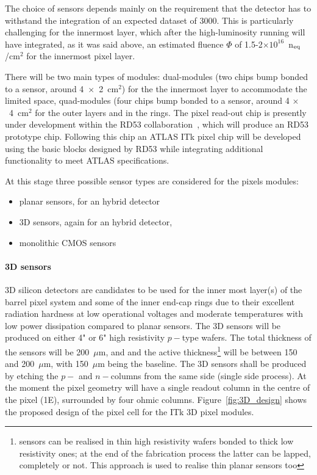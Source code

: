 The choice of sensors depends mainly on the requirement that the detector has to withstand the integration of an expected dataset  of 3000\invfb.  This is particularly challenging for the innermost layer, which after the high-luminosity running will have integrated, as it was said above,  an estimated fluence $\Phi$ of 1.5-2$\times10^{16}$~n$_{\rm eq}$/cm$^2$ for the innermost pixel layer. 

There will be two main types of modules: dual-modules (two chips bump bonded to a sensor, around 
4~$\times$~2~cm$^2$) for the the innermost layer to accommodate the limited space, quad-modules (four 
chips bump bonded to a sensor, around 4 $\times$~4~cm$^2$ for the outer layers and in the rings. 
The pixel read-out chip is presently under development within the RD53 collaboration~\cite{RD53}, 
which will produce an RD53 prototype chip. Following this chip an ATLAS ITk pixel chip will be developed 
using the basic blocks designed by RD53 while integrating additional functionality to meet ATLAS 
specifications.

At this stage three possible sensor types are considered for the pixels modules:

\begin{itemize}
\item planar sensors, for an hybrid detector
\item 3D sensors, again for an hybrid detector,
\item monolithic CMOS sensors
\end{itemize}

\paragraph{3D sensors}
3D silicon detectors are candidates to be used for the inner most layer(s) of the barrel pixel system and 
some of the inner end-cap rings due to their excellent radiation hardness at low operational voltages and 
moderate temperatures with low power dissipation compared to planar sensors.
The 3D sensors will be produced on either 4" or 6" high resistivity $p-$type wafers. 
The total thickness of the sensors will be 200~$\mu$m, and and the active thickness\footnote{sensors can be realised in thin high resistivity wafers bonded to thick low resistivity ones; at the end of the fabrication process the latter can be lapped, completely or not. This approach is used to realise thin planar sensors too} will be between 
150 and 200~$\mu$m, with 150~$\mu$m being the baseline. 
The 3D sensors shall be produced by etching the $p-$ and $n-$columns from the same side (single side process). At the moment the pixel geometry will have a single readout column in the centre of the pixel (1E), surrounded by four ohmic columns. Figure~\ref{fig:3D_design} shows the proposed design of the pixel 
cell for the ITk 3D pixel modules. 

